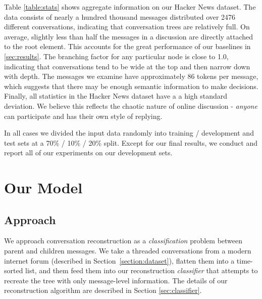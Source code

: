\documentclass{article}
\begin{document}
Table \ref{table:stats} shows aggregate information on our Hacker News
dataset. The data consists of nearly a hundred thousand messages distributed
over 2476 different conversations, indicating that conversation trees 
are relatively full. On average, slightly less than half the messages
in a discussion are directly attached to the root element. This accounts
for the great performance of our baselines in \ref{sec:results}. 
The branching factor for any particular node is close to 1.0, indicating
that conversations tend to be wide at the top and then narrow down with
depth. The messages we examine have approximately 86 tokens per message,
which suggests that there may be enough semantic information to make
decisions. Finally, all statistics in the Hacker News dataset have a
a high standard deviation. We believe this reflects the chaotic nature of
online discussion - \textit{anyone} can participate and has their own
style of replying.

In all cases we divided the input data randomly into training / development
and test sets at a 70\% / 10\% / 20\% split. Except for our final results, we
conduct and report all of our experiments on our development sets.

\section{Our Model}
\subsection{Approach}
\label{sec:approach}
We approach conversation reconstruction as a \textit{classification} problem
between parent and children messages. We take a threaded conversations from a
modern internet forum (described in Section~\ref{section:dataset}), flatten
them into a time-sorted list, and them feed them into our reconstruction
\textit{classifier} that attempts to recreate the tree with only message-level
information. The details of our reconstruction algorithm are described in
Section \ref{sec:classifier}.
\end{document}
